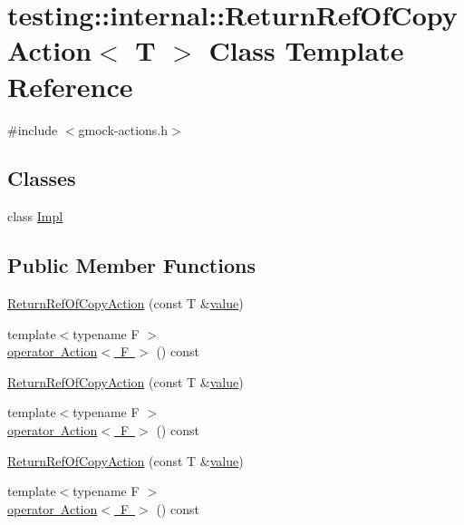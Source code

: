 \hypertarget{classtesting_1_1internal_1_1_return_ref_of_copy_action}{}\section{testing\+::internal\+::Return\+Ref\+Of\+Copy\+Action$<$ T $>$ Class Template Reference}
\label{classtesting_1_1internal_1_1_return_ref_of_copy_action}


{\ttfamily \#include $<$gmock-\/actions.\+h$>$}

\subsection*{Classes}
\begin{DoxyCompactItemize}
\item 
class \mbox{\hyperlink{classtesting_1_1internal_1_1_return_ref_of_copy_action_1_1_impl}{Impl}}
\end{DoxyCompactItemize}
\subsection*{Public Member Functions}
\begin{DoxyCompactItemize}
\item 
\mbox{\hyperlink{classtesting_1_1internal_1_1_return_ref_of_copy_action_a073c18a8b50423b08f6603e860622839}{Return\+Ref\+Of\+Copy\+Action}} (const T \&\mbox{\hyperlink{_obj__test_2lib_2googletest-master_2googlemock_2test_2gmock-matchers__test_8cc_a337b8a670efc0b086ad3af163f3121b6}{value}})
\item 
{\footnotesize template$<$typename F $>$ }\\\mbox{\hyperlink{classtesting_1_1internal_1_1_return_ref_of_copy_action_a8b4829fbb46c3ca6468f3eb5c5b42493}{operator Action$<$ F $>$}} () const
\item 
\mbox{\hyperlink{classtesting_1_1internal_1_1_return_ref_of_copy_action_a073c18a8b50423b08f6603e860622839}{Return\+Ref\+Of\+Copy\+Action}} (const T \&\mbox{\hyperlink{_obj__test_2lib_2googletest-master_2googlemock_2test_2gmock-matchers__test_8cc_a337b8a670efc0b086ad3af163f3121b6}{value}})
\item 
{\footnotesize template$<$typename F $>$ }\\\mbox{\hyperlink{classtesting_1_1internal_1_1_return_ref_of_copy_action_a8b4829fbb46c3ca6468f3eb5c5b42493}{operator Action$<$ F $>$}} () const
\item 
\mbox{\hyperlink{classtesting_1_1internal_1_1_return_ref_of_copy_action_a073c18a8b50423b08f6603e860622839}{Return\+Ref\+Of\+Copy\+Action}} (const T \&\mbox{\hyperlink{_obj__test_2lib_2googletest-master_2googlemock_2test_2gmock-matchers__test_8cc_a337b8a670efc0b086ad3af163f3121b6}{value}})
\item 
{\footnotesize template$<$typename F $>$ }\\\mbox{\hyperlink{classtesting_1_1internal_1_1_return_ref_of_copy_action_a8b4829fbb46c3ca6468f3eb5c5b42493}{operator Action$<$ F $>$}} () const
\end{DoxyCompactItemize}
